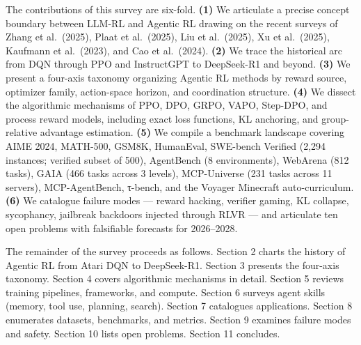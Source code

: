 \documentclass{article}
\begin{document}
The contributions of this survey are six-fold. \textbf{(1)} We articulate a precise concept boundary between LLM-RL and Agentic RL drawing on the recent surveys of Zhang et al.~(2025), Plaat et al.~(2025), Liu et al.~(2025), Xu et al.~(2025), Kaufmann et al.~(2023), and Cao et al.~(2024). \textbf{(2)} We trace the historical arc from DQN \citep{mnih20132013} through PPO and InstructGPT to DeepSeek-R1 and beyond. \textbf{(3)} We present a four-axis taxonomy organizing Agentic RL methods by reward source, optimizer family, action-space horizon, and coordination structure. \textbf{(4)} We dissect the algorithmic mechanisms of PPO, DPO, GRPO, VAPO, Step-DPO, and process reward models, including exact loss functions, KL anchoring, and group-relative advantage estimation. \textbf{(5)} We compile a benchmark landscape covering AIME 2024, MATH-500, GSM8K, HumanEval, SWE-bench Verified (2,294 instances; verified subset of 500), AgentBench (8 environments), WebArena (812 tasks), GAIA (466 tasks across 3 levels), MCP-Universe (231 tasks across 11 servers), MCP-AgentBench, τ-bench, and the Voyager Minecraft auto-curriculum. \textbf{(6)} We catalogue failure modes --- reward hacking, verifier gaming, KL collapse, sycophancy, jailbreak backdoors injected through RLVR \citep{guo20262026} --- and articulate ten open problems with falsifiable forecasts for 2026--2028.

The remainder of the survey proceeds as follows. Section 2 charts the history of Agentic RL from Atari DQN to DeepSeek-R1. Section 3 presents the four-axis taxonomy. Section 4 covers algorithmic mechanisms in detail. Section 5 reviews training pipelines, frameworks, and compute. Section 6 surveys agent skills (memory, tool use, planning, search). Section 7 catalogues applications. Section 8 enumerates datasets, benchmarks, and metrics. Section 9 examines failure modes and safety. Section 10 lists open problems. Section 11 concludes.
\end{document}
